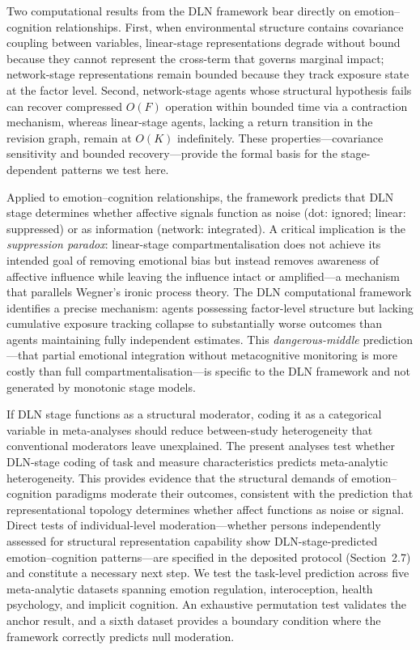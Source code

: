 \documentclass[11pt]{article}
\begin{document}
Two computational results from the DLN framework bear directly on
emotion--cognition relationships. First, when environmental structure
contains covariance coupling between variables, linear-stage
representations degrade without bound because they cannot represent the
cross-term that governs marginal impact; network-stage representations
remain bounded because they track exposure state at the factor level.
Second, network-stage agents whose structural hypothesis fails can
recover compressed $O(F)$ operation within bounded time via a
contraction mechanism, whereas linear-stage agents, lacking a return
transition in the revision graph, remain at $O(K)$
indefinitely\cite{Wu2026}. These properties---covariance sensitivity
and bounded recovery---provide the formal basis for the stage-dependent
patterns we test here.

Applied to emotion--cognition relationships, the framework predicts
that DLN stage determines whether affective signals function as noise
(dot: ignored; linear: suppressed) or as information (network:
integrated). A critical implication is the \textit{suppression paradox}:
linear-stage compartmentalisation does not achieve its intended goal of
removing emotional bias but instead removes awareness of affective
influence while leaving the influence intact or amplified---a mechanism
that parallels Wegner's ironic process theory\cite{Wegner1994}. The DLN
computational framework identifies a precise mechanism: agents possessing
factor-level structure but lacking cumulative exposure tracking collapse
to substantially worse outcomes than agents maintaining fully independent
estimates\cite{Wu2026}. This \textit{dangerous-middle} prediction---that
partial emotional integration without metacognitive monitoring is more
costly than full compartmentalisation---is specific to the DLN framework
and not generated by monotonic stage models.

If DLN stage functions as a structural moderator, coding it as a
categorical variable in meta-analyses should reduce between-study
heterogeneity that conventional moderators leave unexplained. The
present analyses test whether DLN-stage coding of task and measure
characteristics predicts meta-analytic heterogeneity. This provides
evidence that the structural demands of emotion--cognition paradigms
moderate their outcomes, consistent with the prediction that
representational topology determines whether affect functions as noise
or signal. Direct tests of individual-level moderation---whether
persons independently assessed for structural representation
capability show DLN-stage-predicted emotion--cognition patterns---are
specified in the deposited protocol (Section~2.7) and constitute a
necessary next step. We test the task-level prediction across five
meta-analytic datasets spanning emotion
regulation\cite{Webb2012},
interoception\cite{Trevisan2019, VanBael2024, Desmedt2022}, health
psychology\cite{Hoyt2024}, and implicit
cognition\cite{Greenwald2009}. An exhaustive permutation test validates
the anchor result, and a sixth dataset\cite{Zanini2025} provides a
boundary condition where the framework correctly predicts null
moderation.
\end{document}
